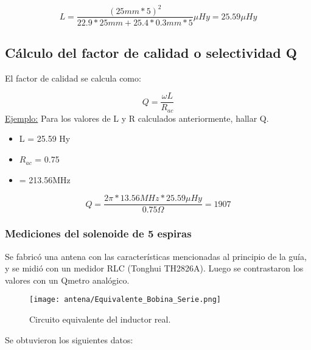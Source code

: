 $$ L = \frac{(25mm*5)^2}{22.9*25mm+25.4*0.3mm*5}\mu Hy = 25.59 \mu Hy$$

\subsection{Cálculo del factor de calidad o selectividad Q}
El factor de calidad se calcula como:

\begin{equation}
\boxed{Q =\frac{\omega L}{R_{ac}}}
\end{equation}
\newline
\underline{Ejemplo:}\newline
Para los valores de L y R calculados anteriormente, hallar Q.

\begin{itemize}
\item L = 25.59 \mu Hy
\item $R_{ac}$ = 0.75 \Omega
\item \omega = 2\pi *13.56MHz
\end{itemize}

$$ Q = \frac{2\pi *13.56MHz*25.59\mu Hy}{0.75 \Omega} = 1907 $$

\subsubsection{Mediciones del solenoide de 5 espiras}
Se fabricó una antena con las características mencionadas al principio de la guía, y se midió
con un medidor RLC (Tonghui TH2826A). Luego se contrastaron los valores con un Qmetro
analógico.

\begin{figure}[H]
\centering
\texttt{[image: antena/Equivalente\_Bobina\_Serie.png]}
\caption{Circuito equivalente del inductor real.}
\label{fig:L_real}
\end{figure}


Se obtuvieron los siguientes datos:

